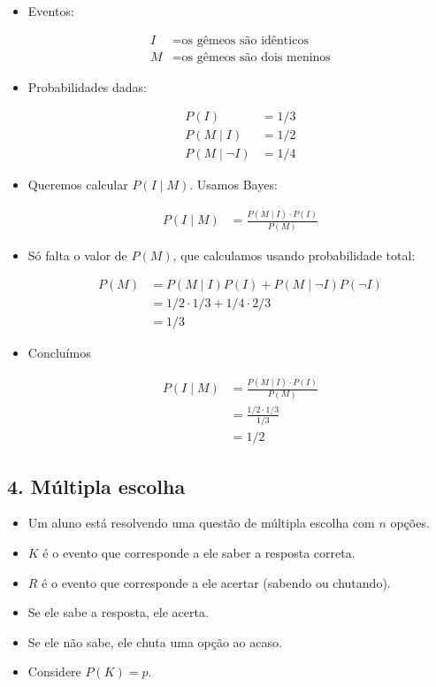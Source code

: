 \documentclass[
  11pt]{report}
\begin{document}
\begin{itemize}
\item
  Eventos:

  \[
  \begin{aligned}
  I &= \text{os gêmeos são idênticos} \\
  M &= \text{os gêmeos são dois meninos}
  \end{aligned}
  \]
\item
  Probabilidades dadas:

  \[
  \begin{aligned}
  P(I) &= 1/3 \\
  P(M \mid I) &= 1/2 \\
  P(M \mid \neg I) &= 1/4
  \end{aligned}
  \]
\item
  Queremos calcular $P(I \mid M)$. Usamos Bayes:

  \[
  \begin{aligned}
  P(I \mid M) 
  &=
  \frac{P(M \mid I) \cdot P(I)}{P(M)}
  \end{aligned}
  \]
\item
  Só falta o valor de $P(M)$, que calculamos usando probabilidade total:

  \[
  \begin{aligned}
  P(M) 
  &=
  P(M \mid I)P(I) + P(M \mid \neg I)P(\neg I) \\
  &=
  1/2 \cdot 1/3 + 1/4 \cdot 2/3 \\
  &=
  1/3
  \end{aligned}
  \]
\item
  Concluímos

  \[
  \begin{aligned}
  P(I \mid M) 
  &=
  \frac{P(M \mid I) \cdot P(I)}{P(M)} \\
  &=
  \frac{1/2 \cdot 1/3}{1/3} \\
  &=
  1/2
  \end{aligned}
  \]
\end{itemize}

\hypertarget{muxfaltipla-escolha}{%
\subsection*{4. Múltipla escolha}\label{muxfaltipla-escolha}}

\begin{rmdbox}

\begin{itemize}
\item
  Um aluno está resolvendo uma questão de múltipla escolha com $n$ opções.
\item
  $K$ é o evento que corresponde a ele saber a resposta correta.
\item
  $R$ é o evento que corresponde a ele acertar (sabendo ou chutando).
\item
  Se ele sabe a resposta, ele acerta.
\item
  Se ele não sabe, ele chuta uma opção ao acaso.
\item
  Considere $P(K) = p$.
\end{itemize}

\end{rmdbox}
\end{document}
